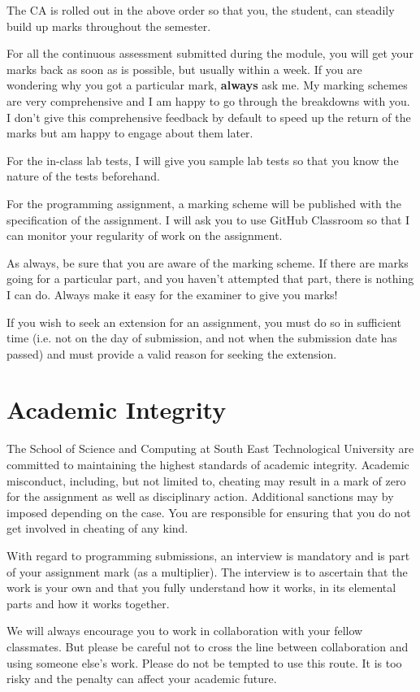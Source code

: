 \documentclass{article}
\begin{document}
The CA is rolled out in the above order so that you, the student, can steadily build up marks throughout the semester. 

For all the continuous assessment submitted during the module, you will get your marks back as soon as is possible, but usually within a week. 
If you are wondering why you got a particular mark, \textbf{always} ask me. My marking schemes are very comprehensive and I am happy to go through the breakdowns with you. 
I don't give this comprehensive feedback by default to speed up the return of the marks but am happy to engage about them later. 

For the in-class lab tests, I will give you sample lab tests so that you know the nature of the tests beforehand. 

For the programming assignment, a marking scheme will be published with the specification of the assignment. I will ask you to use GitHub Classroom so that I can monitor your regularity of work on the assignment.

As always, be sure that you are aware of the marking scheme. 
If there are marks going for a particular part, and you haven't attempted that part, there is nothing I can do. Always make it easy for the examiner to give you marks!

If you wish to seek an extension for an assignment, you must do so in sufficient time (i.e. not on the day of submission, and not 
when the submission date has passed) and must provide a valid reason for seeking the extension. 


\section{Academic Integrity}
The School of Science and Computing  at South East Technological University are  committed to maintaining the highest standards of academic integrity. 
Academic misconduct, including, but not limited to, cheating may result in a mark of zero for the assignment as well as disciplinary action.
Additional sanctions may by imposed depending on the case. You are responsible for ensuring that you do not get involved in cheating of any kind. 
 
With regard to programming submissions, an interview is mandatory and is part of your assignment mark (as a multiplier). 
The interview is to ascertain that the work is your own and that you fully understand how it works, in its elemental parts and how it works together. 
 
We  will always encourage you to work in collaboration with your fellow classmates. But please be careful not to cross the line between collaboration and using someone else's work. 
Please do not be tempted to use this route. 
It is too risky and the penalty can affect your academic future. 
\end{document}
